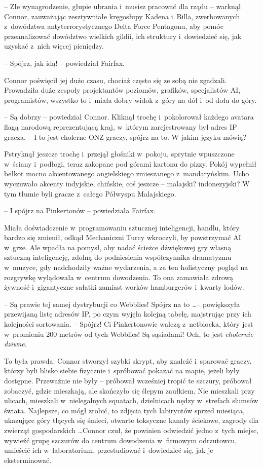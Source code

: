 \documentclass[oneside,polish,11pt,rmheadings]{mwbk}
\begin{document}
-- Złe wynagrodzenie, głupie ubrania i~musisz pracować dla rządu -- warknął Connor, zauważając zesztywniałe kręgosłupy Kadena i~Billa, zwerbowanych z~dowództwa antyterrorystycznego Delta Force Pentagonu, aby pomóc przeanalizować dowództwo wielkich gildii, ich struktury i~dowiedzieć się, jak uzyskać z~nich więcej pieniędzy.

-- Spójrz, jak idą! -- powiedział Fairfax. 

Connor poświęcił jej dużo czasu, chociaż często się ze sobą nie zgadzali. Prowadziła duże zespoły projektantów poziomów, grafików, specjalistów AI, programistów, wszystko to i~miała dobry widok z~góry na dół i~od dołu do góry.

-- Są dobrzy -- powiedział Connor. Kliknął trochę i~pokolorował każdego avatara flagą narodową reprezentującą kraj, w~którym zarejestrowany był adres IP gracza. -- I to jest cholerne ONZ graczy, spójrz na to. W jakim języku mówią? 

Pstryknął jeszcze trochę i~przejął głośniki w~pokoju, sprytnie wpuszczone w~ściany i~podłogi, teraz zakopane pod górami kartonu do pizzy. Pokój wypełnił bełkot mocno akcentowanego angielskiego zmieszanego z~mandaryńskim. Ucho wyczuwało akcenty indyjskie, chińskie, coś jeszcze -- malajski? indonezyjski? W tym tłumie byli gracze z~całego Półwyspu Malajskiego.

-- I spójrz na Pinkertonów -- powiedziała Fairfax. 

Miała doświadczenie w~programowaniu sztucznej inteligencji, handlu, który bardzo się zmienił, odkąd Mechaniczni Turcy wkroczyli, by powstrzymać AI w~grze. Ale wpadła na pomysł, aby nadać ścieżce dźwiękowej gry własną sztuczną inteligencję, zdolną do podniesienia współczynnika dramatyzmu w~muzyce, gdy nadchodziły ważne wydarzenia, a za ten holistyczny pogląd na rozgrywkę wylądowała w~centrum dowodzenia. To ona zamawiała zdrową żywność i~gigantyczne sałatki zamiast worków hamburgerów i~kwarty lodów. 

-- Są prawie tej samej dystrybucji co Webblies! Spójrz na to \ldots  -- powiększyła przewijaną listę adresów IP, po czym wyjęła kolejną tabelę, majstrując przy ich kolejności sortowania. -- Spójrz! Ci Pinkertonowie walczą z~netblocka, który jest w~promieniu 200 metrów od tych Webblies! Są sąsiadami! Och, to jest \textit{cholernie dziwne}.

To była prawda. Connor stworzył szybki skrypt, aby znaleźć i~sparować graczy, którzy byli blisko siebie fizycznie i~spróbować pokazać na mapie, jeżeli były dostępne. Przeważnie nie były -- próbował wcześniej tropić te szczury, próbował zobaczyć, gdzie mieszkają, ale skończyło się ślepym zaułkiem. Nie mieszkali przy ulicach, mieszkali w~nielegalnych squatach, dzielnicach nędzy w~strefach slumsów świata. Najlepsze, co mógł zrobić, to zdjęcia tych labiryntów sprzed miesiąca, ukazujące góry tlących się śmieci, otwarte toksyczne kanały ściekowe, zagrody dla zwierząt gospodarskich \ldots  Connor czuł, że powinien odwiedzić jedno z~tych miejsc, wywieźć grupę szczurów do centrum dowodzenia w~firmowym odrzutowcu, umieścić ich w~laboratorium, przestudiować i~dowiedzieć się, jak je eksterminować.
\end{document}
